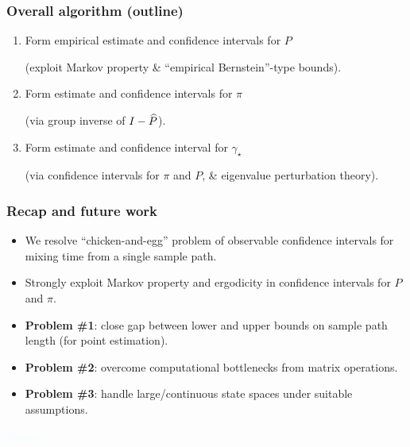 \documentclass[11pt,compress,blue4,notheorems]{beamer}
\newcommand\fns\footnotesize
\newcommand\gap{\ensuremath{\gamma_{\star}}}
\begin{document}
\begin{frame}
  \frametitle{Overall algorithm (outline)}

  \begin{enumerate}
    \item
      Form empirical estimate and confidence intervals for $P$

      {\fns(exploit Markov property \& ``empirical Bernstein''-type bounds)}.

      \medskip

    \item
      Form estimate and confidence intervals for $\pi$

      {\fns(via group inverse of $I - \widehat P$)}.

      \medskip

    \item
      Form estimate and confidence interval for $\gap$

      {\fns(via confidence intervals for $\pi$ and $P$, \& eigenvalue perturbation theory)}.

  \end{enumerate}
\end{frame}


\begin{frame}
  \frametitle{Recap and future work}

  \begin{itemize}
    \item
      We resolve ``chicken-and-egg'' problem of observable
      confidence intervals for mixing time from a single sample path.

    \item<2->
      Strongly exploit Markov property and ergodicity in confidence
      intervals for $P$ and $\pi$.

    \item<3->
      \textbf{Problem \#1}:
      \textcolor{britishracinggreen}{%
        close gap between lower and upper bounds on sample path length
        (for point estimation).%
      }

    \item<4->
      \textbf{Problem \#2}:
      \textcolor{britishracinggreen}{%
        overcome computational bottlenecks from matrix operations.%
      }

    \item<5->
      \textbf{Problem \#3}:
      \textcolor{boldgreen}{%
        handle large/continuous state spaces under suitable
        assumptions.%
      }

  \end{itemize}

  \hfill{%
    \textcolor{azure}{\Large Thanks!}%
  }
\end{frame}
\end{document}
